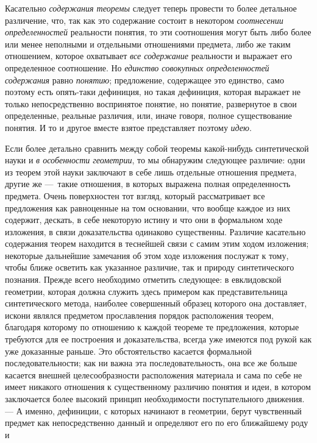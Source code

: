 \documentclass[twoside]{article}
\begin{document}
Касательно {\em содержания
теоремы} следует теперь провести то более детальное
различение, что, так как это содержание состоит в некотором
{\em соотнесении определенностей}
реальности понятия, то эти соотношения могут быть либо более
или менее неполными и отдельными отношениями предмета, либо же таким
отношением, которое охватывает {\em все
содержание} реальности и выражает его определенное
соотношение. Но {\em единство совокупных
определенностей содержания} равно
{\em понятию};
предложение, содержащее это единство, само поэтому есть
опять-таки дефиниция, но такая дефиниция, которая выражает не только
непосредственно воспринятое понятие, но понятие, развернутое в свои
определенные, реальные различия, или, иначе говоря, полное существование
понятия. И то и другое вместе взятое представляет поэтому
{\em идею}.

Если более детально сравнить между собой теоремы какой-нибудь
синтетической науки и {\em в особенности
геометрии}, то мы обнаружим следующее различие: одни из
теорем этой науки заключают в себе лишь отдельные отношения предмета,
другие же —~такие отношения, в которых выражена полная
определенность предмета. Очень поверхностен тот взгляд, который
рассматривает все предложения как равноценные на том основании, что вообще
каждое из них содержит, дескать, в себе некоторую истину и что они в
формальном ходе изложения, в связи доказательства одинаково существенны.
Различие касательно содержания теорем находится в теснейшей связи с самим
этим ходом изложения; некоторые дальнейшие замечания об этом ходе изложения
послужат к тому, чтобы ближе осветить как указанное
различие, так и природу синтетического познания. Прежде всего необходимо
отметить следующее: в евклидовской геометрии, которая должна служить здесь
примером как представительница синтетического метода, наиболее совершенный
образец которого она доставляет, искони являлся предметом прославления
порядок расположения теорем, благодаря которому по отношению к каждой
теореме те предложения, которые требуются для ее построения и
доказательства, всегда уже имеются под рукой как уже доказанные раньше. Это
обстоятельство касается формальной последовательности; как ни важна эта
последовательность, она все же больше касается внешней целесообразности
расположения материала и сама по себе не имеет никакого отношения к
существенному различию понятия и идеи, в котором заключается более высокий
принцип необходимости поступательного движения. — А именно,
дефиниции, с которых начинают в геометрии, берут чувственный предмет как
непосредственно данный и определяют его по его ближайшему роду и
\end{document}
